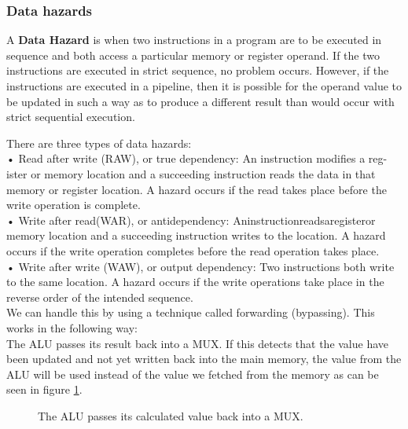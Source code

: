\subsubsection{Data hazards}
A \textbf{Data Hazard} is when two instructions in a program are to be executed in sequence and both access a particular memory or register operand. If the two instructions are executed in strict sequence, no problem occurs. However, if the instructions are executed in a pipeline, then it is possible for the operand value to be updated in such a way as to produce a different result than would occur with strict sequential execution.

There are three types of data hazards: \\
• Read after write (RAW), or true dependency: An instruction modifies a reg- ister or memory location and a succeeding instruction reads the data in that memory or register location. A hazard occurs if the read takes place before the write operation is complete. \\
• Write after read(WAR), or antidependency: Aninstructionreadsaregisteror memory location and a succeeding instruction writes to the location. A hazard occurs if the write operation completes before the read operation takes place. \\
• Write after write (WAW), or output dependency: Two instructions both write to the same location. A hazard occurs if the write operations take place in the reverse order of the intended sequence. \\

We can handle this by using a technique called forwarding (bypassing). This works in the following way: \\
The ALU passes its result back into a MUX. If this detects that the value have been updated and not yet written back into the main memory, the value from the ALU will be used instead of the value we fetched from the memory as can be seen in figure \ref{fig:bypassing}.

\begin{figure}[H]
	\centering
	\caption{The ALU passes its calculated value back into a MUX.}
	\label{fig:bypassing}
\end{figure}

